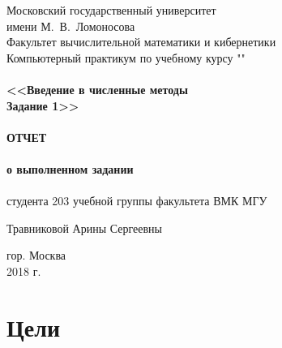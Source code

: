 \documentclass[a4paper,12pt,titlepage,finall]{article}
\begin{document}
\begin{titlepage}
    \begin{center}
	{\small \sc Московский государственный университет \\имени М.~В.~Ломоносова\\
	Факультет вычислительной математики и кибернетики\\}
	\vfill
	{\Large \sc Компьютерный практикум по учебному курсу ""}\\
	~\\
	{\large \bf <<Введение в численные методы \\
	Задание 1>>}\\
	~\\
	{\large \bf  ОТЧЕТ \\ }
	~\\
	{\small \bf  о выполненном задании \\ }
	~\\
	{\small \sc студента 203 учебной группы факультета ВМК МГУ\\}

	{\small \sc Травниковой Арины Сергеевны\\}
	\vfill
    \end{center}

    \begin{center}
	\vfill
	{\small гор. Москва\\2018 г.}
    \end{center}
\end{titlepage}

\tableofcontents
\newpage

\section{Цели}
\end{document}
